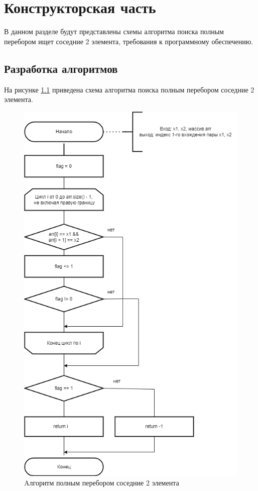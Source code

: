 \chapter{Конструкторская часть}

В данном разделе будут представлены схемы алгоритма поиска полным перебором ищет соседние 2 элемента, требования к программному обеспечению.

\section{Разработка алгоритмов}

На рисунке \ref{img:solution} приведена схема алгоритма поиска полным перебором соседние 2 элемента. 

\begin{figure}[h]
	\begin{center}
		\includegraphics[scale=0.5]{img/solution.png}
	\end{center}
	\captionsetup{justification=centering}
	\caption{Aлгоритм полным перебором соседние 2 элемента}
	\label{img:solution}
\end{figure}
\clearpage
